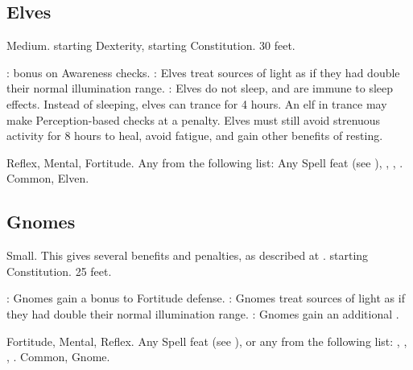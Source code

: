 \subsection{Elves}
 Medium.
  starting Dexterity,  starting Constitution.
 30 feet.
\begin{itemize}
    :  bonus on Awareness checks.
    : Elves treat sources of light as if they had double their normal illumination range.
    : Elves do not sleep, and are immune to sleep effects. Instead of sleeping, elves can trance for 4 hours. An elf in trance may make Perception-based checks at a  penalty. Elves must still avoid strenuous activity for 8 hours to heal, avoid fatigue, and gain other benefits of resting.
\end{itemize}
  Reflex,  Mental,  Fortitude.
 Any from the following list: Any Spell feat (see ), , , .
 Common, Elven.

\subsection{Gnomes}
 Small. This gives several benefits and penalties, as described at .
  starting Constitution.
 25 feet.
\begin{itemize}
    : Gnomes gain a  bonus to Fortitude defense.
    : Gnomes treat sources of light as if they had double their normal illumination range.
    : Gnomes gain an additional .
\end{itemize}
  Fortitude,  Mental,  Reflex.
 Any Spell feat (see ), or any from the following list: , , , .
 Common, Gnome.

